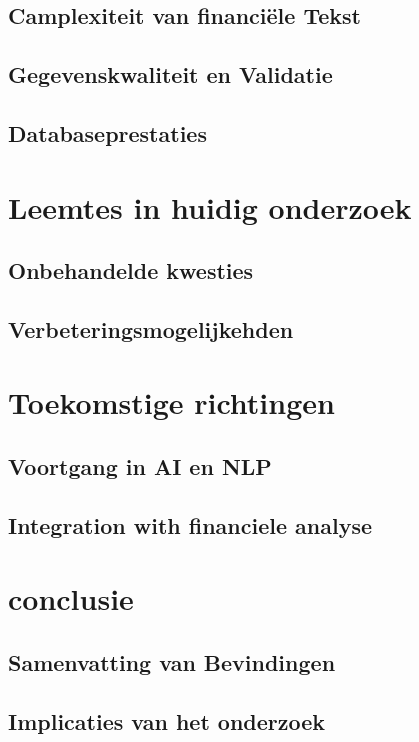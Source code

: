 \subsection{Camplexiteit van financiële Tekst}
\subsection{Gegevenskwaliteit en Validatie}
\subsection{Databaseprestaties}
\section{Leemtes in huidig onderzoek}
\subsection{Onbehandelde kwesties}
\subsection{Verbeteringsmogelijkehden}

\section{Toekomstige richtingen}
\subsection{Voortgang in AI en NLP}
\subsection{Integration with financiele analyse}
\section{conclusie}
\subsection{Samenvatting van Bevindingen}
\subsection{Implicaties van het onderzoek}